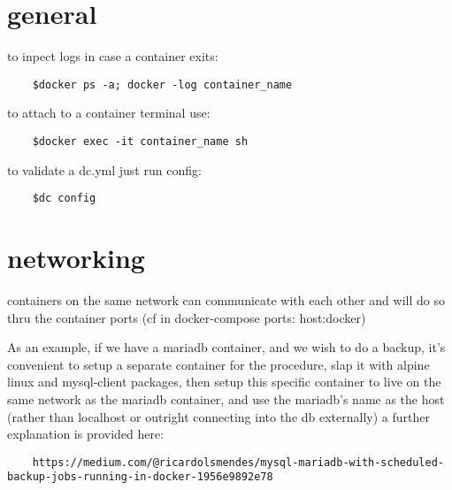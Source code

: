 \section{general}%
\label{sec:general}

to inpect logs in case a container exits:
\begin{verbatim}
	$docker ps -a; docker -log container_name
\end{verbatim}

to attach to a container terminal use:
\begin{verbatim}
	$docker exec -it container_name sh
\end{verbatim}

to validate a dc.yml just run config:
\begin{verbatim}
	$dc config
\end{verbatim}

\section{networking}%
\label{sec:networking}

containers on the same network can communicate with each other and will do so thru the container ports (cf in docker-compose ports: host:docker)

As an example, if we have a mariadb container, and we wish to do a backup, it's convenient to setup a separate container for the procedure, slap it with alpine linux and mysql-client packages, then setup this specific container to live on the same network as the mariadb container, and use the mariadb's name as the host (rather than localhost or outright connecting into the db externally) a further explanation is provided here:
\begin{verbatim}
	https://medium.com/@ricardolsmendes/mysql-mariadb-with-scheduled-backup-jobs-running-in-docker-1956e9892e78
\end{verbatim}
